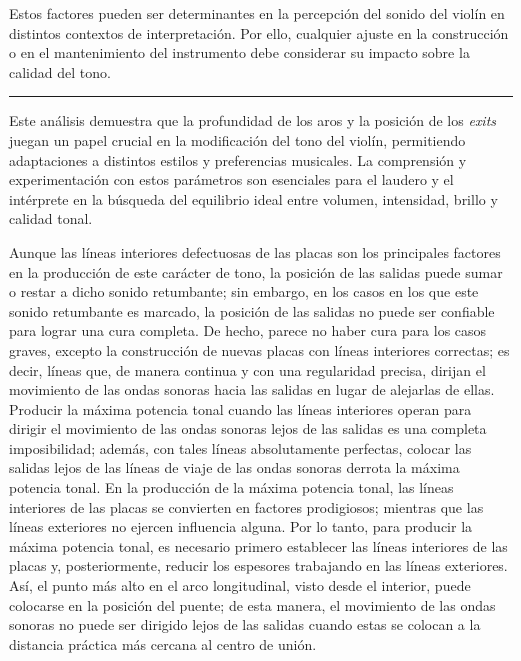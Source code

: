 \documentclass[12pt]{book}
\begin{document}
Estos factores pueden ser determinantes en la percepción del sonido del violín en distintos contextos de interpretación. Por ello, cualquier ajuste en la construcción o en el mantenimiento del instrumento debe considerar su impacto sobre la calidad del tono.

\noindent\rule{8cm}{0.4pt}

Este análisis demuestra que la profundidad de los aros y la posición de los \textit{exits} juegan un papel crucial en la modificación del tono del violín, permitiendo adaptaciones a distintos estilos y preferencias musicales. La comprensión y experimentación con estos parámetros son esenciales para el laudero y el intérprete en la búsqueda del equilibrio ideal entre volumen, intensidad, brillo y calidad tonal.

Aunque las líneas interiores defectuosas de las placas son los principales factores en la producción de este carácter de tono, la posición de las salidas puede sumar o restar a dicho sonido retumbante; sin embargo, en los casos en los que este sonido retumbante es marcado, la posición de las salidas no puede ser confiable para lograr una cura completa. De hecho, parece no haber cura para los casos graves, excepto la construcción de nuevas placas con líneas interiores correctas; es decir, líneas que, de manera continua y con una regularidad precisa, dirijan el movimiento de las ondas sonoras hacia las salidas en lugar de alejarlas de ellas. Producir la máxima potencia tonal cuando las líneas interiores operan para dirigir el movimiento de las ondas sonoras lejos de las salidas es una completa imposibilidad; además, con tales líneas absolutamente perfectas, colocar las salidas lejos de las líneas de viaje de las ondas sonoras derrota la máxima potencia tonal. En la producción de la máxima potencia tonal, las líneas interiores de las placas se convierten en factores prodigiosos; mientras que las líneas exteriores no ejercen influencia alguna. Por lo tanto, para producir la máxima potencia tonal, es necesario primero establecer las líneas interiores de las placas y, posteriormente, reducir los espesores trabajando en las líneas exteriores. Así, el punto más alto en el arco longitudinal, visto desde el interior, puede colocarse en la posición del puente; de esta manera, el movimiento de las ondas sonoras no puede ser dirigido lejos de las salidas cuando estas se colocan a la distancia práctica más cercana al centro de unión.
\end{document}

